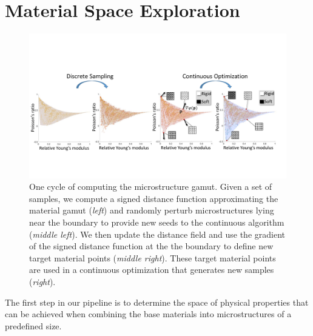 \section{Material Space Exploration}
\label{sec:sampling}

\begin{figure}[t]
	\centering
	\includegraphics[width=.95\linewidth]{figs/topsampling.pdf}
	\caption{One cycle of computing the microstructure gamut. 
		Given a set of samples, we compute a signed distance function approximating the material gamut (\emph{left}) and randomly perturb microstructures lying near the boundary to provide new seeds to the continuous algorithm (\emph{middle left}). We then update the distance field and use the gradient of the signed distance function at the the boundary to define new target material points (\emph{middle right}). These target material points are used in a continuous optimization that generates new samples (\emph{right}).} 
	\label{fig:lssampling}
\end{figure}

The first step in our pipeline is to determine the space of physical properties that can be achieved when combining the base materials into microstructures of a predefined size.

